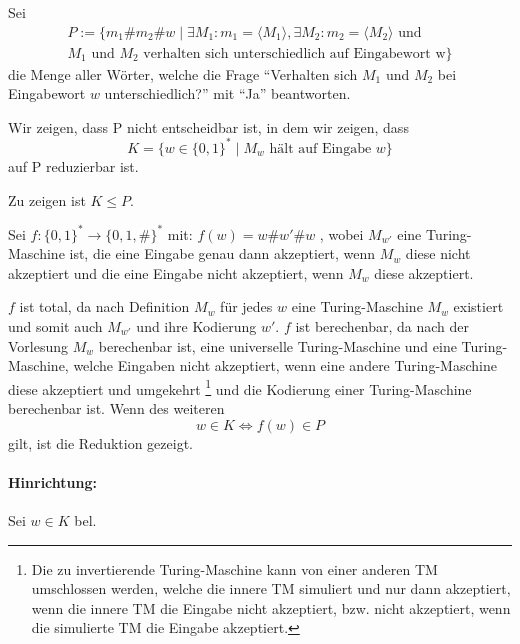 \documentclass[10pt,leqno ]{article}
\begin{document}
Sei 
\begin{align*}
    P := \{ m_1 \# m_2 \# w \mid \exists M_1 : m_1 = \langle M_1 \rangle , \exists M_2 : m_2 = \langle M_2 \rangle \text{ und } \\ M_1 \text{ und } M_2 \text{ verhalten sich unterschiedlich auf Eingabewort w} \}
\end{align*}
die Menge aller Wörter, welche die Frage \enquote{Verhalten sich $M_1$ und $M_2$ bei Eingabewort $w$ unterschiedlich?} mit \enquote{Ja} beantworten.

\begin{flushleft}
    Wir zeigen, dass P nicht entscheidbar ist, in dem wir zeigen, dass 
    \[ K = \{ w \in \{0,1 \}^* \mid M_w \text{ hält auf Eingabe } w \} \]
    auf P reduzierbar ist.
\end{flushleft}

\begin{flushleft}
    Zu zeigen ist $K \leq P$.
\end{flushleft}

\begin{flushleft}
    Sei $f: \{ 0, 1 \}^* \rightarrow \{ 0,1,\# \}^*$ mit: \( f(w) = w\#w'\#w\)
, wobei $M_{w'}$ eine Turing-Maschine ist, die eine Eingabe genau dann akzeptiert, wenn $M_w$ diese nicht akzeptiert und die eine Eingabe nicht akzeptiert, wenn $M_w$ diese akzeptiert.
\end{flushleft}

\begin{flushleft}
    $f$ ist total, da nach Definition $M_w$ für jedes $w$ eine Turing-Maschine $M_w$ existiert und somit auch $M_{w'}$ und ihre Kodierung $w'$. $f$ ist berechenbar, da nach der Vorlesung $M_w$ berechenbar ist, eine universelle Turing-Maschine und eine Turing-Maschine, welche Eingaben nicht akzeptiert, wenn eine andere Turing-Maschine diese akzeptiert und umgekehrt \footnote{Die zu invertierende Turing-Maschine kann von einer anderen TM umschlossen werden, welche die innere TM simuliert und nur dann akzeptiert, wenn die innere TM die Eingabe nicht akzeptiert, bzw. nicht akzeptiert, wenn die simulierte TM die Eingabe akzeptiert.} und die Kodierung einer Turing-Maschine berechenbar ist.
    Wenn des weiteren
    \[ w \in K \Leftrightarrow f(w) \in P \]
    gilt, ist die Reduktion gezeigt.
\end{flushleft}

\paragraph{Hinrichtung:} 
Sei $w \in K$ bel.
\end{document}
